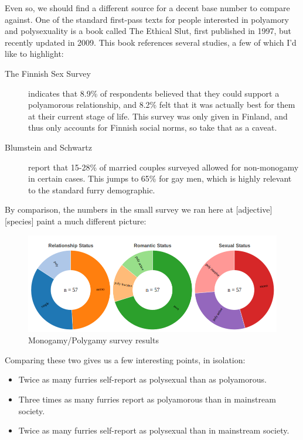 Even so, we should find a different source for a decent base number to compare against. One of the standard first-pass texts for people interested in polyamory and polysexuality is a book called The Ethical Slut, first published in 1997, but recently updated in 2009. This book references several studies, a few of which I'd like to highlight:

\begin{description}
  \item[The Finnish Sex Survey] indicates that 8.9\% of respondents believed that they could support a polyamorous relationship, and 8.2\% felt that it was actually best for them at their current stage of life. This survey was only given in Finland, and thus only accounts for Finnish social norms, so take that as a caveat.
  \item [Blumstein and Schwartz] report that 15-28\% of married couples surveyed allowed for non-monogamy in certain cases. This jumps to 65\% for gay men, which is highly relevant to the standard furry demographic.
\end{description}

By comparison, the numbers in the small survey we ran here at [adjective][species] paint a much different picture:

\begin{figure}
  \begin{center}
    \includegraphics[width=\textwidth]{content/assets/polynormativity--results}
  \end{center}
  \caption{Monogamy/Polygamy survey results}
\end{figure}

Comparing these two gives us a few interesting points, in isolation:

\begin{itemize}
  \item Twice as many furries self-report as polysexual than as polyamorous.
  \item Three times as many furries report as polyamorous than in mainstream society.
  \item Twice as many furries self-report as polysexual than in mainstream society.
\end{itemize}

